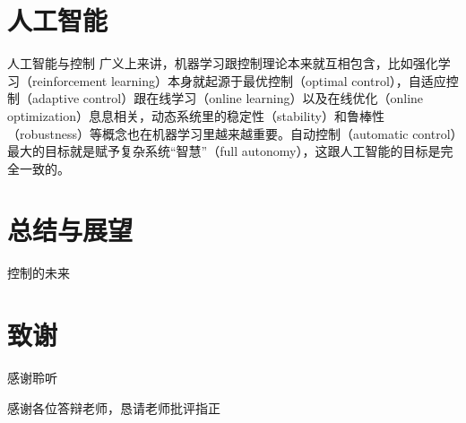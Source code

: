 \documentclass[10pt]{ctexbeamer}
\begin{document}
\section{人工智能}

\begin{frame}{人工智能与控制}
  广义上来讲，机器学习跟控制理论本来就互相包含，比如强化学习（reinforcement learning）本身就起源于最优控制（optimal control），自适应控制（adaptive control）跟在线学习（online learning）以及在线优化（online optimization）息息相关，动态系统里的稳定性（stability）和鲁棒性（robustness）等概念也在机器学习里越来越重要。自动控制（automatic control）最大的目标就是赋予复杂系统“智慧”（full autonomy），这跟人工智能的目标是完全一致的。
\end{frame}

\section{总结与展望}
    \begin{frame}{控制的未来}
    \end{frame}



\section*{致谢}  
  \begin{frame}
  \textcolor{rstd}{\Huge{\centerline{感谢聆听}}}
  \vspace{8pt}
  
  \textcolor{rgreen}{\centerline{感谢各位答辩老师，恳请老师批评指正}}
  \end{frame}
\end{document}
